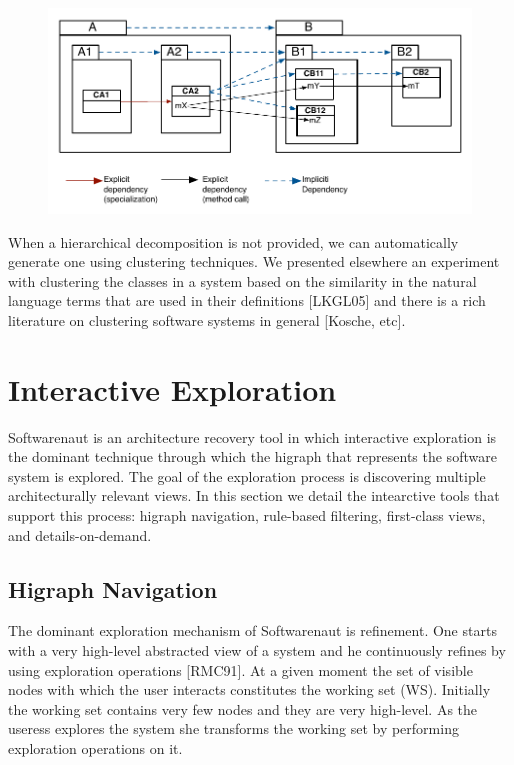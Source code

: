 \documentclass[preprint,12pt]{elsarticle}
\begin{document}
\begin{figure}[h]
\begin{center}
\includegraphics[width=\linewidth]{images/DependencyAggregation}
\caption{}
\label{}
\end{center}
\end{figure}
When a hierarchical decomposition is not provided, we can automatically generate one using clustering techniques. We presented elsewhere an experiment with clustering the classes in a system based on the similarity in the natural language terms that are used in their definitions [LKGL05] and there is a rich literature on clustering software systems in general [Kosche, etc].


\section {Interactive Exploration}

Softwarenaut is an architecture recovery tool in which interactive exploration is the dominant technique through which the higraph that represents the software system is explored. The goal of the exploration process is discovering multiple architecturally relevant views. In this section we detail the intearctive tools that support this process: higraph navigation, rule-based filtering, first-class views, and details-on-demand.  

\subsection{Higraph Navigation}

The dominant exploration mechanism of Softwarenaut is refinement. One starts with a very high-level abstracted view of a system and he continuously refines by using exploration operations [RMC91]. At a given moment the set of visible nodes with which the user interacts constitutes the working set (WS). Initially the working set contains very few nodes and they are very high-level. As the useress explores the system she transforms the working set by performing exploration operations on it. 
\end{document}
